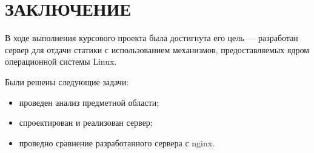 \chapter*{ЗАКЛЮЧЕНИЕ}

В ходе выполнения курсового проекта была достигнута его цель --- разработан сервер для отдачи статики с использованием механизмов, предоставляемых ядром операционной системы Linux.

Были решены следующие задачи:

\begin{itemize}[label=---]
    \item проведен анализ предметной области;
    \item спроектирован и реализован сервер;
    \item проведно сравнение разработанного сервера с nginx.
\end{itemize}
